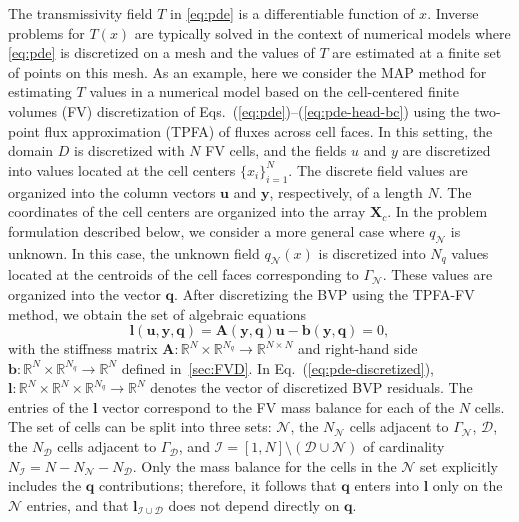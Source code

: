 \documentclass{agujournal2019}
\begin{document}
The transmissivity field $T$ in \cref{eq:pde} is a differentiable function of $x$. Inverse problems for $T(x)$ are typically solved in the context of numerical models where \cref{eq:pde} is discretized on a mesh and the values of $T$ are estimated at a finite set of points on this mesh. As an example, here we consider the MAP method for estimating $T$ values in a numerical model based on the cell-centered finite volumes (FV) discretization of Eqs.~(\cref{eq:pde})--(\ref{eq:pde-head-bc}) using the two-point flux approximation (TPFA) of fluxes across cell faces. In this setting, the domain $D$ is discretized with $N$ FV cells, and the fields $u$ and $y$ are discretized into values located at the cell centers $\{ x_i \}_{i=1}^N$. The discrete field values are organized into the column vectors $\mathbf{u}$ and $\mathbf{y}$, respectively, of a length $N$. The coordinates of the cell centers are organized into the array $\mathbf{X}_c$. In the problem formulation described below, we consider a more general case where $q_\mathcal{N}$ is unknown. In this case, the unknown field $q_\mathcal{N}(x)$ is discretized into $N_q$ values located at the centroids of the cell faces corresponding to $\Gamma_\mathcal{N}$. These values are organized into the vector $\mathbf{q}$. After discretizing the BVP using the TPFA-FV method, we obtain the set of algebraic equations
%
\begin{equation}
  \label{eq:pde-discretized}
  \mathbf{l}(\mathbf{u}, \mathbf{y}, \mathbf{q}) = \mathbf{A}(\mathbf{y}, \mathbf{q}) \mathbf{u} - \mathbf{b}(\mathbf{y}, \mathbf{q}) = 0,
\end{equation}
%
with the stiffness matrix $\mathbf{A} \colon \mathbb{R}^N \times \mathbb{R}^{N_q} \to \mathbb{R}^{N \times N}$ and right-hand side $\mathbf{b} \colon \mathbb{R}^N \times \mathbb{R}^{N_q} \to \mathbb{R}^N$ defined in~\ref{sec:FVD}.
In Eq.~(\ref{eq:pde-discretized}), $\mathbf{l} \colon \mathbb{R}^N \times \mathbb{R}^N \times \mathbb{R}^{N_q} \to \mathbb{R}^N$ denotes the vector of discretized BVP residuals.
%
The entries of the $\mathbf{l}$ vector correspond to the FV mass balance for each of the $N$ cells.
The set of cells can be split into three sets: $\mathcal{N}$, the $N_{\mathcal{N}}$ cells adjacent to $\Gamma_\mathcal{N}$, $\mathcal{D}$, the $N_{\mathcal{D}}$ cells adjacent to $\Gamma_\mathcal{D}$, and $\mathcal{I} = [1, N] \setminus (\mathcal{D} \cup \mathcal{N})$ of cardinality $N_{\mathcal{I}} = N - N_{\mathcal{N}} - N_{\mathcal{D}}$.
Only the mass balance for the cells in the $\mathcal{N}$ set explicitly includes the $\mathbf{q}$ contributions; therefore, it follows that $\mathbf{q}$ enters into $\mathbf{l}$ only on the $\mathcal{N}$ entries, and that $\mathbf{l}_{\mathcal{I} \cup \mathcal{D}}$ does not depend directly on $\mathbf{q}$.
\end{document}
